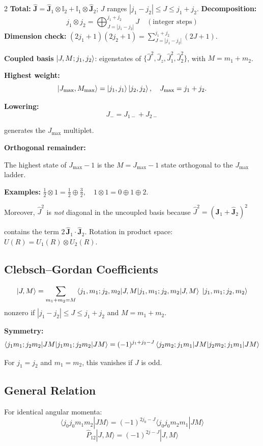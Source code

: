 \documentclass[9pt,a4paper]{article} %
\newcommand{\Id}{\mathbb{I}}
\begin{document}
\begin{multicols}{2}
\textbf{Total:} $\hat{\mathbf{J}}=\hat{\mathbf{J}}_1\otimes\Id_2+\Id_1\otimes\hat{\mathbf{J}}_2$;\; $J$ ranges $|j_1-j_2|\le J\le j_1+j_2$.
	\textbf{Decomposition:}
\[
j_1\otimes j_2=\bigoplus_{J=|j_1-j_2|}^{j_1+j_2} J \quad (\text{integer steps})
\]
	\textbf{Dimension check:}\; $(2j_1+1)(2j_2+1)=\sum_{J=|j_1-j_2|}^{j_1+j_2}(2J+1)$.

\textbf{Coupled basis} $\ket{J,M;j_1,j_2}$: eigenstates of $\{\hat{J}^2,\hat{J}_z,\hat{J}_1^2,\hat{J}_2^2\}$, with $M = m_1 + m_2$.

\textbf{Highest weight:}
\[
\ket{J_{\max}, M_{\max}} = \ket{j_1, j_1} \ket{j_2, j_2}, \quad J_{\max} = j_1 + j_2.
\]

\textbf{Lowering:}
\[
J_- = J_{1-} + J_{2-}
\]

generates the $J_{\max}$ multiplet.

\textbf{Orthogonal remainder:}

The highest state of $J_{\max} - 1$ is the $M = J_{\max} - 1$ state orthogonal to the $J_{\max}$ ladder.

\textbf{Examples:}
$
\tfrac{1}{2} \otimes 1 = \tfrac{1}{2} \oplus \tfrac{3}{2},
\quad
1 \otimes 1 = 0 \oplus 1 \oplus 2.
$

Moreover, $\hat{J}^2$ is \emph{not} diagonal in the uncoupled basis because
$\hat{J}^2 = (\hat{\mathbf{J}}_1 + \hat{\mathbf{J}}_2)^2$

contains the term $2 \, \hat{\mathbf{J}}_1 \cdot \hat{\mathbf{J}}_2$. 
Rotation in product space: $U(R)=U_1(R)\otimes U_2(R)$.

\subsection{Clebsch--Gordan Coefficients}
\small{\[
\ket{J,M}=\sum_{m_1+m_2=M}\braket{j_1,m_1;j_2,m_2|J,M}\;\ket{j_1,m_1;j_2,m_2}
\]}
nonzero if $|j_1-j_2|\le J\le j_1+j_2$ and $M=m_1+m_2$.

{\footnotesize
\textbf{Symmetry:}
\[
\braket{j_1 m_1;j_2 m_2|JM}=(-1)^{j_1+j_2-J}\braket{j_2 m_2;j_1 m_1|JM}
\]

For $j_1=j_2$ and $m_1=m_2$, this vanishes if $J$ is odd.
}
\subsection{General Relation}
For identical angular momenta:
\[
\langle j_0 j_0 m_1 m_2 | J M \rangle = (-1)^{2j_0 - J} \langle j_0 j_0 m_2 m_1 | J M \rangle
\]
\[\hat{P}_{12} |J, M\rangle = (-1)^{2j - J} |J, M\rangle\]

\end{multicols}
\end{document}
